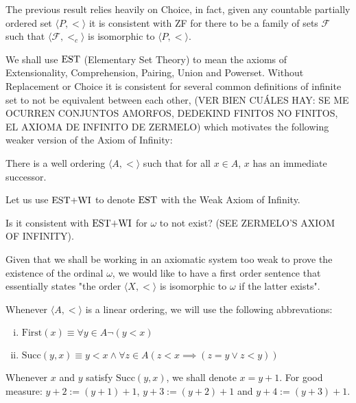 The previous result relies heavily on Choice, in fact, given any countable partially ordered set $\langle P,< \rangle$ it is consistent with ZF for there to be a family of sets $\mathcal{F}$ such that $\langle \mathcal{F},<_c\rangle$ is isomorphic to $\langle P,< \rangle$.

We shall use $\operatorname{EST}$ (Elementary Set Theory) to mean the axioms of Extensionality, Comprehension, Pairing, Union and Powerset. 
Without Replacement or Choice it is consistent for several common definitions of infinite set to not be equivalent between each other, 
(VER BIEN CUÁLES HAY: SE ME OCURREN CONJUNTOS AMORFOS, DEDEKIND FINITOS NO FINITOS, EL AXIOMA DE INFINITO DE ZERMELO) which motivates the following weaker version of the Axiom of Infinity:

\begin{WeakInf}
	There is a well ordering $\langle A , < \rangle$ such that for all $x\in A$, $x$ has an immediate successor.
\end{WeakInf}

Let us use $\operatorname{\text{EST+WI}}$ to denote $\operatorname{EST}$ with the Weak Axiom of Infinity.

\begin{question}
	Is it consistent with $\operatorname{\text{EST+WI}}$ for $\omega$ to not exist? (SEE ZERMELO'S AXIOM OF INFINITY).
\end{question}

Given that we shall be working in an axiomatic system too weak to prove the existence of the ordinal $\omega$, we would like to have a first order sentence that essentially states "the order $\langle X , < \rangle$ is isomorphic to $\omega$ if the latter exists".

\begin{definition}
	Whenever $\langle A,< \rangle$ is a linear ordering, we will use the following abbrevations:
	
	\begin{enumerate}[(i)]
		\item $\text{First}(x) \equiv \forall y \in A \neg(y < x)$
		\item $\text{Succ}(y,x) \equiv y<x \land \forall z\in A (z < x \implies (z=y \lor z < y))$
	\end{enumerate}

	Whenever $x$ and $y$ satisfy $\text{Succ}(y,x)$, we shall denote $x = y+1$. For good measure: $y+2 := (y+1)+1$, $y+3 := (y+2)+1$ and $y+4 := (y+3)+1$.
\end{definition}

